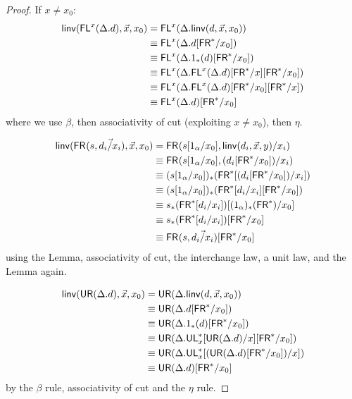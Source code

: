 \begin{proof}
If $x \neq x_0$: \begin{align*}
\mathsf{linv}(\mathsf{FL}^{x}(\Delta.d),\vec{x},x_0) 
&= \mathsf{FL}^{x}(\Delta.\mathsf{linv}(d,\vec{x},x_0)) \\
&\equiv \mathsf{FL}^{x}(\Delta.d[\mathsf{FR}^*/x_0]) \\
&\equiv \mathsf{FL}^{x}(\Delta.1_*(d)[\mathsf{FR}^*/x_0]) \\
&\equiv \mathsf{FL}^{x}(\Delta.\mathsf{FL}^{x}(\Delta.d)[\mathsf{FR}^*/x][\mathsf{FR}^*/x_0]) \\
&\equiv \mathsf{FL}^{x}(\Delta.\mathsf{FL}^{x}(\Delta.d)[\mathsf{FR}^*/x_0][\mathsf{FR}^*/x]) \\
&\equiv \mathsf{FL}^{x}(\Delta.d)[\mathsf{FR}^*/x_0]
\end{align*}
where we use $\beta$, then associativity of cut (exploiting $x \neq x_0$), then $\eta$.

\begin{align*}
\mathsf{linv}(\mathsf{FR}_{}(s,\vec{d_i/x_i}),\vec{x},x_0) 
&= \mathsf{FR}_{}(s[1_\alpha/x_0],{{\mathsf{linv}(d_i,\vec{x},y)}/x_i}) \\
&\equiv \mathsf{FR}_{}(s[1_\alpha/x_0],(d_i[\mathsf{FR}^*/x_0])/x_i) \\
&\equiv (s[1_\alpha/x_0])_*(\mathsf{FR}^*[(d_i[\mathsf{FR}^*/x_0])/x_i]) \\
&\equiv (s[1_\alpha/x_0])_*(\mathsf{FR}^*[d_i/x_i][\mathsf{FR}^*/x_0]) \\
&\equiv s_*(\mathsf{FR}^*[d_i/x_i])[(1_\alpha)_*(\mathsf{FR}^*)/x_0] \\
&\equiv s_*(\mathsf{FR}^*[d_i/x_i])[\mathsf{FR}^*/x_0] \\
&\equiv \mathsf{FR}_{}(s,\vec{d_i/x_i})[\mathsf{FR}^*/x_0]
\end{align*}
using the Lemma, associativity of cut, the interchange law, a unit law, and the Lemma again.

\begin{align*}
\mathsf{linv}(\mathsf{UR}(\Delta.d),\vec{x},x_0) 
&= \mathsf{UR}(\Delta.\mathsf{linv}(d,\vec{x},x_0)) \\
&\equiv \mathsf{UR}(\Delta.d[\mathsf{FR}^*/x_0]) \\
&\equiv \mathsf{UR}(\Delta.1_*(d)[\mathsf{FR}^*/x_0]) \\
&\equiv \mathsf{UR}(\Delta.\mathsf{UL}^*_{x}[\mathsf{UR}(\Delta.d)/x][\mathsf{FR}^*/x_0]) \\
&\equiv \mathsf{UR}(\Delta.\mathsf{UL}^*_{x}[(\mathsf{UR}(\Delta.d)[\mathsf{FR}^*/x_0])/x])\\
&\equiv \mathsf{UR}(\Delta.d)[\mathsf{FR}^*/x_0]
\end{align*}
by the $\beta$ rule, associativity of cut and the $\eta$ rule.


\end{proof}
